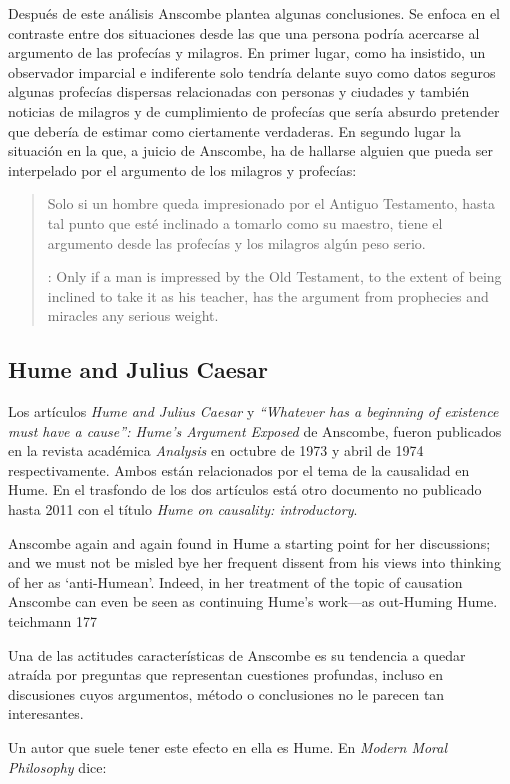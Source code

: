 Después de este análisis Anscombe plantea algunas conclusiones. Se enfoca en el
contraste entre dos situaciones desde las que una persona podría acercarse al
argumento de las profecías y milagros. En primer lugar, como ha insistido, un
observador imparcial e indiferente solo tendría delante suyo como datos seguros
algunas profecías dispersas relacionadas con personas y ciudades y también
noticias de milagros y de cumplimiento de profecías que sería absurdo pretender
que debería de estimar como ciertamente verdaderas. En segundo lugar la
situación en la que, a juicio de Anscombe, ha de hallarse alguien que pueda ser
interpelado por el argumento de los milagros y profecías:
\blockquote[{\cite[]{}}: Only if a man is impressed by the Old Testament, to the
extent of being inclined to take it as his teacher, has the argument from
prophecies and miracles any serious weight.]{Solo si un hombre queda
  impresionado por el Antiguo Testamento, hasta tal punto que esté inclinado a
  tomarlo como su maestro, tiene el argumento desde las profecías y los milagros
  algún peso serio.}

\subsection{Hume and Julius Caesar}

Los artículos \emph{Hume and Julius Caesar} y \emph{``Whatever has a beginning
  of existence must have a cause'': Hume’s Argument Exposed} de Anscombe, fueron
publicados en la revista académica \emph{Analysis} en octubre de 1973 y abril de
1974 respectivamente. Ambos están relacionados por el tema de la causalidad en
Hume. En el trasfondo de los dos artículos está otro documento no publicado
hasta 2011 con el título \emph{Hume on causality: introductory}.

Anscombe again and again found in Hume a starting point for her discussions; and
we must not be misled bye her frequent dissent from his views into thinking of
her as `anti-Humean'. Indeed, in her treatment of the topic of causation
Anscombe can even be seen as continuing Hume's work---as out-Huming Hume.
teichmann 177

  Una de las actitudes características de Anscombe es su tendencia a quedar
  atraída por preguntas que representan cuestiones profundas, incluso en
  discusiones cuyos argumentos, método o conclusiones no le parecen tan
  interesantes.

  Un autor que suele tener este efecto en ella es Hume. En \emph{Modern Moral
    Philosophy} dice:

